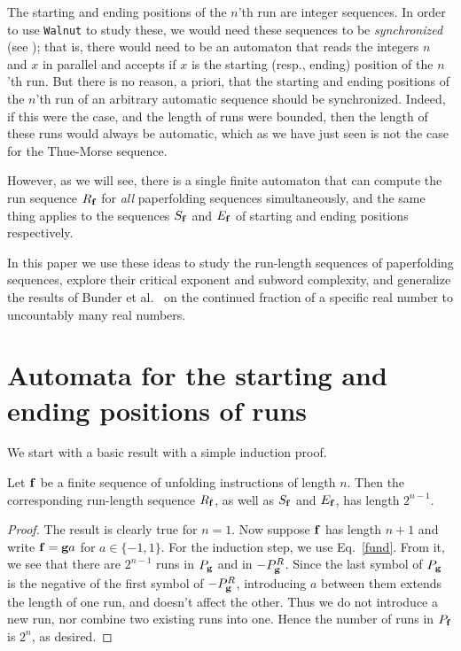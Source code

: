 \documentclass[12pt,reqno]{article}
\begin{document}
The starting and ending positions 
of the $n$'th run are integer sequences.
In order to use {\tt Walnut} to study these, we would need these sequences
to be {\it synchronized\/} (see \cite{Shallit:2021}); that is, there would
need to be an automaton that reads the integers $n$ and $x$ in parallel and accepts
if $x$ is the starting (resp., ending) position of the $n$'th run.
But there is no reason, a priori, that the starting and ending 
positions of the $n$'th run of an arbitrary automatic sequence should be
synchronized. Indeed, if this were the case, and the length of runs were
bounded, then the length of these runs would
always be automatic, which as we have just seen is not the case for the
Thue-Morse sequence.

However, as we will see,
there is a single finite automaton that can compute
the run sequence $R_{\bf f}$ for
{\it all\/} paperfolding sequences simultaneously,
and the same thing applies to the sequences $S_{\bf f}$ and $E_{\bf f}$
of starting
and ending positions respectively.

In this paper we use these ideas to study the run-length sequences of
paperfolding sequences, explore their critical exponent and subword
complexity, and generalize the results of Bunder et al.~\cite{Bunder&Bates&Arnold:2024} on the continued fraction of a specific real number to uncountably
many real numbers.

\section{Automata for the starting and ending positions of runs}

We start with a basic result with a simple induction proof.
\begin{proposition}
Let $\bf f$ be a finite sequence of unfolding instructions of
length $n$.  Then the corresponding run-length sequence 
$R_{\bf f}$, as well as $S_{\bf f}$ and $E_{\bf f}$,
has length $2^{n-1}$.
\end{proposition}

\begin{proof}
The result is clearly true for $n=1$.  Now suppose
${\bf f}$ has length $n+1$ and write 
${\bf f} = {\bf g} a$ for $a \in \{ -1,1 \}$.
For the induction step,
we use Eq.~\eqref{fund}.  From it, we see that there are
$2^{n-1}$ runs in $P_{\bf g}$ and in $-P_{\bf g}^R$.
Since the last symbol of $P_{\bf g}$ is the negative of
the first symbol of $-P_{\bf g}^R$,
introducing $a$ between them extends the length of
one run, and doesn't affect the other.  Thus we do not introduce
a new run, nor combine two existing runs into one.
Hence the number of runs in $P_{\bf f} $ is $2^n$, as desired.
\end{proof}
\end{document}
